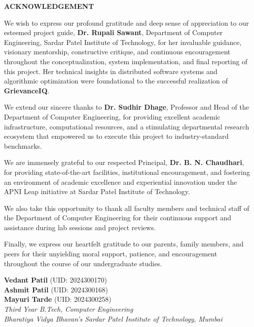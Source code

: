 \newpage
\thispagestyle{plain}
\begin{center}
\Large\textbf{ACKNOWLEDGEMENT}
\end{center}
\vspace{1cm}

\noindent We wish to express our profound gratitude and deep sense of appreciation to our esteemed project guide, \textbf{Dr. Rupali Sawant}, Department of Computer Engineering, Sardar Patel Institute of Technology, for her invaluable guidance, visionary mentorship, constructive critique, and continuous encouragement throughout the conceptualization, system implementation, and final reporting of this project. Her technical insights in distributed software systems and algorithmic optimization were foundational to the successful realization of \textbf{GrievanceIQ}.

\vspace{0.6cm}
\noindent We extend our sincere thanks to \textbf{Dr. Sudhir Dhage}, Professor and Head of the Department of Computer Engineering, for providing excellent academic infrastructure, computational resources, and a stimulating departmental research ecosystem that empowered us to execute this project to industry-standard benchmarks.

\vspace{0.6cm}
\noindent We are immensely grateful to our respected Principal, \textbf{Dr. B. N. Chaudhari}, for providing state-of-the-art facilities, institutional encouragement, and fostering an environment of academic excellence and experiential innovation under the APNI Leap initiative at Sardar Patel Institute of Technology.

\vspace{0.6cm}
\noindent We also take this opportunity to thank all faculty members and technical staff of the Department of Computer Engineering for their continuous support and assistance during lab sessions and project reviews.

\vspace{0.6cm}
\noindent Finally, we express our heartfelt gratitude to our parents, family members, and peers for their unyielding moral support, patience, and encouragement throughout the course of our undergraduate studies.

\vspace{2.5cm}

\noindent
\begin{flushright}
\textbf{Vedant Patil} (UID: 2024300170)\\
\textbf{Ashmit Patil} (UID: 2024300168)\\
\textbf{Mayuri Tarde} (UID: 2024300258)\\
\vspace{0.2cm}
\textit{Third Year B.Tech, Computer Engineering}\\
\textit{Bharatiya Vidya Bhavan's Sardar Patel Institute of Technology, Mumbai}
\end{flushright}
